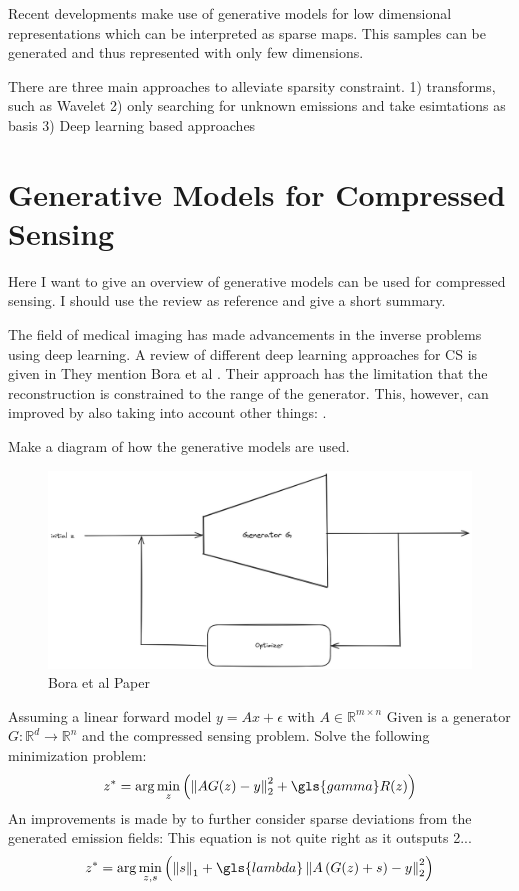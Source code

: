 Recent developments make use of generative models for low dimensional representations which can be interpreted as sparse maps.
This samples can be generated and thus represented with only few dimensions.

There are three main approaches to alleviate sparsity constraint.
1) transforms, such as Wavelet
2) only searching for unknown emissions and take esimtations as basis
3) Deep learning based approaches


\section{Generative Models for Compressed Sensing}
Here I want to give an overview of generative models can be used for compressed sensing.
I should use the review as reference and give a short summary.

The field of medical imaging has made advancements in the inverse problems using deep learning.
A review of different deep learning approaches for CS is given in \parencite{ReviewCSUsingAI}
They mention Bora et al \parencite{CSUsingAI}.
Their approach has the limitation that the reconstruction is constrained to the range of the generator.
This, however, can improved by also taking into account other things: \parencite{SparseCSUsingAI}.

Make a diagram of how the generative models are used.
\begin{figure}[h!]
    \centering
    \includegraphics[width=\textwidth]{figures/02_related_work/bora_et_al.png}
    \caption{Bora et al Paper}
\end{figure}

Assuming a linear forward model $y = Ax + \epsilon$ with $A \in \mathbb{R}^{m \times n}$
Given is a generator $G: \mathbb{R}^d \to \mathbb{R}^n$ and the compressed sensing problem.
Solve the following minimization problem:
\begin{equation}
    z^* = \arg\min_{z}{\left( \norm{A G(z) - y}_2^2 + \gls{gamma} R(z) \right)}
\end{equation}
An improvements is made by to further consider sparse deviations from the generated emission fields:
This equation is not quite right as it outsputs 2...
\begin{equation}
    z^* = \arg\min_{z, s}{\left(\norm{s}_1 + \gls{lambda} \norm{A \left( G(z) + s \right) - y}_2^2 \right)}
\end{equation}

